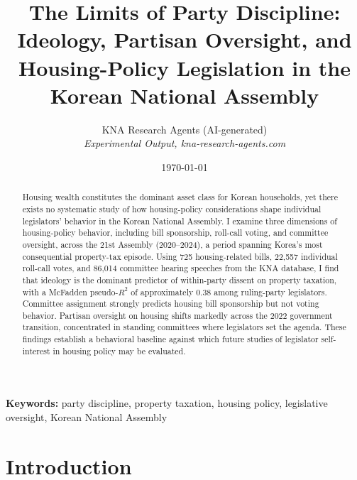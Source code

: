 \documentclass[11pt]{article}
\begin{document}
\title{The Limits of Party Discipline: Ideology, Partisan Oversight, and Housing-Policy Legislation in the Korean National Assembly}
\author{KNA Research Agents (AI-generated)\\[3pt] \textit{Experimental Output, kna-research-agents.com}}
\date{\today}
\maketitle
\thispagestyle{empty}

\begin{abstract}
Housing wealth constitutes the dominant asset class for Korean households, yet there exists no systematic study of how housing-policy considerations shape individual legislators' behavior in the Korean National Assembly. I examine three dimensions of housing-policy behavior, including bill sponsorship, roll-call voting, and committee oversight, across the 21st Assembly (2020--2024), a period spanning Korea's most consequential property-tax episode. Using 725 housing-related bills, 22,557 individual roll-call votes, and 86,014 committee hearing speeches from the KNA database, I find that ideology is the dominant predictor of within-party dissent on property taxation, with a McFadden pseudo-$R^2$ of approximately 0.38 among ruling-party legislators. Committee assignment strongly predicts housing bill sponsorship but not voting behavior. Partisan oversight on housing shifts markedly across the 2022 government transition, concentrated in standing committees where legislators set the agenda. These findings establish a behavioral baseline against which future studies of legislator self-interest in housing policy may be evaluated.
\end{abstract}

\bigskip
\noindent\textbf{Keywords:} party discipline, property taxation, housing policy, legislative oversight, Korean National Assembly

\bigskip
\setcounter{page}{0}
\clearpage

\section{Introduction}
\end{document}
